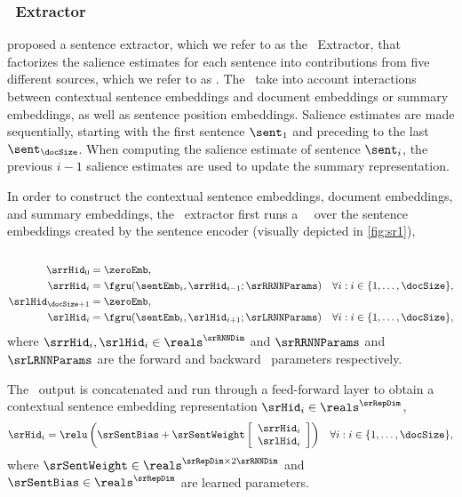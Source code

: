 \subsubsection{\srext~Extractor}

\citet{nallapati2017summarunner} proposed a sentence extractor, which we refer
to as the \srext~Extractor, that factorizes the salience estimates for each
sentence into contributions from five different sources, which we refer to as
\saliencefactors.  The \saliencefactors~take into account interactions between
contextual sentence embeddings and document embeddings or summary embeddings,
as well as sentence position embeddings. Salience estimates are made
sequentially, starting with the first sentence $\sent_1$ and preceding to the
last $\sent_\docSize$. When computing the salience estimate of sentence
$\sent_i$, the previous $i-1$ salience estimates are used to update the summary
representation.

In order to construct the contextual sentence embeddings, document embeddings,
and summary embeddings, the \srext~extractor first runs a
\bidirectional~\gru~over the sentence embeddings created by the sentence
encoder (visually depicted in \autoref{fig:sr1}),\\



\noindent{}\\[-40pt]
\begin{align}
    \srrHid_0 &= \zeroEmb, \\
    \srrHid_i &= \fgru(\sentEmb_i, \srrHid_{i-1}; \srRRNNParams) &
    \forall i : i \in \{1,\ldots,\docSize\},\\
    \srlHid_{\docSize + 1} &= \zeroEmb,\\
    \srlHid_i &= \fgru(\sentEmb_i, \srlHid_{i+1}; \srLRNNParams)
    & \forall i : i \in \{1,\ldots,\docSize\},
\end{align}
where $\srrHid_i,\srlHid_i \in \reals^{\srRNNDim}$ and $\srRRNNParams$ and
$\srLRNNParams$ are the forward and backward \gru~parameters respectively.

The \gru~output is concatenated and run through a feed-forward layer to obtain
a contextual sentence embedding representation $\srHid_i \in
\reals^{\srRepDim}$,\\

\noindent{} 
\begin{align}
\srHid_i  & = \relu\left(\srSentBias + \srSentWeight \left[ \begin{array}{c} \srrHid_i \\ \srlHid_i  \end{array} \right]  \right) &
    \forall i : i \in \{1,\ldots,\docSize\},
\end{align}
where $\srSentWeight \in \reals^{\srRepDim \times 2\srRNNDim}$ and $\srSentBias
\in \reals^{\srRepDim}$ are learned parameters.

